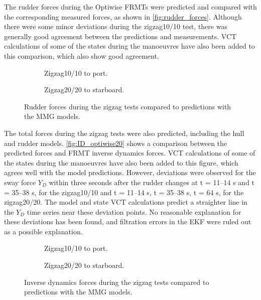 The rudder forces during the Optiwise FRMTs were predicted and compared with the corresponding measured forces, as shown in \autoref{fig:rudder_forces}. Although there were some minor deviations during the zigzag10/10 test, there was generally good agreement between the predictions and measurements. VCT calculations of some of the states during the manoeuvres have also been added to this comparison, which also show good agreement.
\begin{figure}[h]
    \centering
    \begin{subfigure}[b]{\textwidth}
        \centering
        
        \caption{Zigzag10/10 to port.}
        \label{fig:ID_measured_rudder_zigzag_10_10}
    \end{subfigure}
     \vfill
    \begin{subfigure}[b]{\textwidth}
        \centering
        
        \caption{Zigzag20/20 to starboard.}
        \label{fig:ID_measured_rudder_zigzag_20_20}
    \end{subfigure}
    \caption{Rudder forces during the zigzag tests compared to predictions with the MMG models.}
    \label{fig:rudder_forces}
\end{figure}

The total forces during the zigzag tests were also predicted, including the hull and rudder models. \autoref{fig:ID_optiwise20}  shows a comparison between the predicted forces and FRMT inverse dynamics forces. VCT calculations of some of the states during the manoeuvres have also been added to this figure, which agrees well with the model predictions.
However, deviations were observed for the sway force $Y_D$ within three seconds after the rudder changes at t = 11--14 s and t = 35--38 s, for the zigzag10/10 and t = 11--14 s, t = 35--38 s, t = 64 s, for the zigzag20/20. The model and state VCT calculations predict a straighter line in the $Y_D$ time series near these deviation points. No reasonable explanation for these deviations has been found, and filtration errors in the EKF were ruled out as a possible explanation.
\begin{figure}[h]
    \centering
    \begin{subfigure}[b]{\textwidth}
        \centering
        
        \caption{Zigzag10/10 to port.}
        \label{fig:ID_MMG_zigzag_10_10}
    \end{subfigure}
     \vfill
    \begin{subfigure}[b]{\textwidth}
        \centering
        
        \caption{Zigzag20/20 to starboard.}
        \label{fig:ID_MMG_zigzag_20_20}
    \end{subfigure}
    \caption{Inverse dynamics forces during the zigzag tests compared to predictions with the MMG models.}
    \label{fig:ID_optiwise20}
\end{figure}


